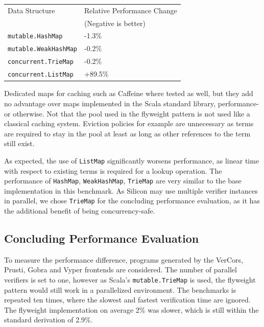 \documentclass[11pt]{article}
\begin{document}
    \begin{center}
        \begin{tabular}{ ll } 
        \hline
        Data Structure & Relative Performance Change \\ 
        & (Negative is better) \\
        \hline
        \texttt{mutable.HashMap} & -1.3\% \\ 
        \texttt{mutable.WeakHashMap} & -0.2\% \\
        \texttt{concurrent.TrieMap} & -0.2\% \\
        \texttt{concurrent.ListMap} & +89.5\% \\ 
        \hline
        \end{tabular}
    \end{center}

    Dedicated maps for caching such as Caffeine \cite{caffeine} where tested as well,
    but they add no advantage over maps
    implemented in the Scala standard library, performance- or otherwise.
    Not that the pool used in the flyweight pattern is
    not used like a classical caching system. Eviction policies for example
    are unnecessary as terms are required to stay in the pool at least as long
    as other references to the term still exist. 

    As expected, the use of \texttt{ListMap} significantly worsens performance,
    as linear time with respect to existing terms is required for a lookup operation.
    The performance of \texttt{HashMap}, \texttt{WeakHashMap}, \texttt{TrieMap}
    are very similar to the base implementation in this benchmark.
    As Silicon may use multiple verifier instances in parallel,
    we chose \texttt{TrieMap} for the concluding performance evaluation, as it has
    the additional benefit of being concurrency-safe.
    

    \subsection{Concluding Performance Evaluation}

    To measure the performance difference, programs generated by the VerCors,
    Prusti, Gobra and Vyper frontends are considered. The number of parallel 
    verifiers is set to one, however as Scala's \texttt{mutable.TrieMap} is used,
    the flyweight pattern would still work in a parallelized environment. The benchmarks is repeated ten times, where the
    slowest and fastest verification time are ignored. The flyweight implementation on average 2\% was slower,
    which is still within the standard derivation of 2.9\%.
\end{document}
